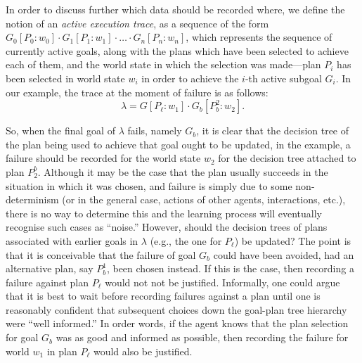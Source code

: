 In order to discuss further which data should be recorded where, we define the
notion of an \textit{active execution trace}, as a sequence of the form
$G_0[P_0:w_0] \cdot G_1[P_1:w_1] \cdot \ldots \cdot G_n[P_n:w_n]$, which
represents the sequence of currently active goals, along with the plans which
have been selected to achieve each of them, and the world state in which the
selection was made---plan $P_i$ has been selected in world state $w_i$ in order
to achieve the $i$-th active subgoal $G_i$.
In our example, the trace at the moment of failure is as follows:
\[ \lambda=G[P_\ell:w_1] \cdot G_b[P_b^2:w_2]. \]


So, when the final goal of $\lambda$ fails, namely $G_b$, it is clear that the
decision tree of the plan being used to achieve that goal ought to be updated, in
the example, a failure should be recorded for the world state $w_2$ for the
decision tree attached to plan $P_2^b$.  Although it may be the case that the
plan usually succeeds in the situation in which it was chosen, and failure is
simply due to some non-determinism (or in the general case, actions of other
agents, interactions, etc.), there is no way to determine this and the learning
process will eventually recognise such cases as ``noise.''
However, should the decision trees of plans associated with earlier goals in
$\lambda$ (e.g., the one for $P_\ell$) be updated?  The point is that it is
conceivable that the failure of goal $G_b$ could have been avoided, had an
alternative plan, say $P_b^1$, been chosen instead. If this is the case, then
recording a failure against plan $P_\ell$ would not not be justified.
Informally, one could argue that it is best to wait before recording failures
against a plan until one is reasonably confident that subsequent choices down the
goal-plan tree hierarchy were ``well informed.'' In order words, if the agent
knows that the plan selection for goal $G_b$ was as good and informed as
possible, then recording the failure for world $w_1$ in plan $P_\ell$ would
also be justified.


\newcommand{\procedurefont}[1]{\mathsf{#1}}
\newcommand{\StableGoal}{\procedurefont{StableGoal}}
\newcommand{\RecordTrace}{\procedurefont{RecordFailedTrace}}
\newcommand{\RecordWorldDT}{\procedurefont{RecordWorldDT}}


